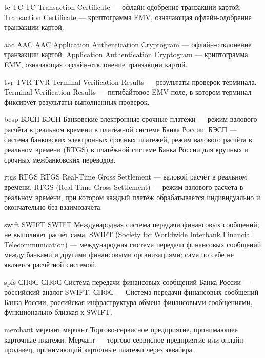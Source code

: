 \DeclareTerm
{tc}
{TC}
{TC}
{Transaction Certificate — офлайн-одобрение транзакции картой.}
{Transaction Certificate — криптограмма EMV, означающая офлайн-одобрение транзакции картой.}

\DeclareTerm
{aac}
{AAC}
{AAC}
{Application Authentication Cryptogram — офлайн-отклонение транзакции картой.}
{Application Authentication Cryptogram — криптограмма EMV, означающая офлайн-отклонение транзакции картой.}

\DeclareTerm
{tvr}
{TVR}
{TVR}
{Terminal Verification Results — результаты проверок терминала.}
{Terminal Verification Results — пятибайтовое EMV-поле, в котором терминал фиксирует результаты выполненных проверок.}

\DeclareTerm
{besp}
{БЭСП}
{БЭСП}
{Банковские электронные срочные платежи — режим валового расчёта в реальном времени в платёжной системе Банка России.}
{БЭСП — система банковских электронных срочных платежей, режим валового расчёта в реальном времени (RTGS) в платёжной системе Банка России для крупных и срочных межбанковских переводов.}

\DeclareTerm
{rtgs}
{RTGS}
{RTGS}
{Real-Time Gross Settlement — валовой расчёт в реальном времени.}
{RTGS (Real-Time Gross Settlement) — режим валового расчёта в реальном времени, при котором каждый платёж обрабатывается индивидуально и окончательно без взаимозачёта.}

\DeclareTerm
{swift}
{SWIFT}
{SWIFT}
{Международная система передачи финансовых сообщений; не выполняет расчёт сама.}
{SWIFT (Society for Worldwide Interbank Financial Telecommunication) — международная система передачи финансовых сообщений между банками и другими финансовыми организациями; сама по себе не является расчётной системой.}

\DeclareTerm
{spfs}
{СПФС}
{СПФС}
{Система передачи финансовых сообщений Банка России — российский аналог SWIFT.}
{СПФС — Система передачи финансовых сообщений Банка России, российская инфраструктура обмена финансовыми сообщениями, функционально близкая к SWIFT.}

\DeclareTerm
{merchant}
{мерчант}
{мерчант}
{Торгово-сервисное предприятие, принимающее карточные платежи.}
{Мерчант — торгово-сервисное предприятие или онлайн-продавец, принимающий карточные платежи через эквайера.}
